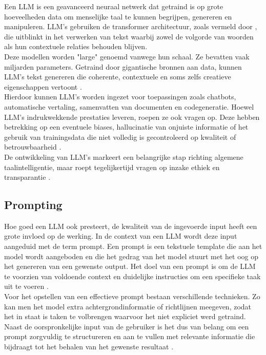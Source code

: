 Een LLM is een geavanceerd neuraal netwerk dat getraind is op grote hoeveelheden data om menselijke taal te kunnen begrijpen, genereren en manipuleren. LLM's gebruiken de transformer architectuur, zoals vermeld door \textcite{vaswani2023attentionneed}, die uitblinkt in het verwerken van tekst waarbij zowel de volgorde van woorden als hun contextuele relaties behouden blijven.
\\[1em]
Deze modellen worden "large" genoemd vanwege hun schaal. Ze bevatten vaak miljarden parameters. Getraind door gigantische bronnen aan data, kunnen LLM's tekst genereren die coherente, contextuele en soms zelfs creatieve eigenschappen vertoont \autocite{Gupta2025}.
\\[1em]
Hierdoor kunnen LLM’s worden ingezet voor toepassingen zoals chatbots, automatische vertaling, samenvatten van documenten en codegeneratie. Hoewel LLM’s indrukwekkende prestaties leveren, roepen ze ook vragen op. Deze hebben betrekking op een eventuele biases, hallucinatie van onjuiste informatie of het gebruik van trainingsdata die niet volledig is gecontroleerd op kwaliteit of betrouwbaarheid \autocite{Gupta2025}.
\\[1em]
De ontwikkeling van LLM’s markeert een belangrijke stap richting algemene taalintelligentie, maar roept tegelijkertijd vragen op inzake ethiek en transparantie \autocite{Gupta2025}.

\subsection{Prompting} 

Hoe goed een LLM ook presteert, de kwaliteit van de ingevoerde input heeft een grote invloed op de werking. In de context van een LLM wordt deze input aangeduid met de term prompt. Een prompt is een tekstuele template die aan het model wordt aangeboden en die het gedrag van het model stuurt met het oog op het genereren van een gewenste output. Het doel van een prompt is om de LLM te voorzien van voldoende context en duidelijke instructies om een specifieke taak uit te voeren \autocite{Marvin2024}.
\\[1em]
Voor het opstellen van een effectieve prompt bestaan verschillende technieken. Zo kan men het model extra achtergrondinformatie of richtlijnen meegeven, zodat het in staat is taken te volbrengen waarvoor het niet expliciet werd getraind. Naast de oorspronkelijke input van de gebruiker is het dus van belang om een prompt zorgvuldig te structureren en aan te vullen met relevante informatie die bijdraagt tot het behalen van het gewenste resultaat \autocite{Marvin2024}.

